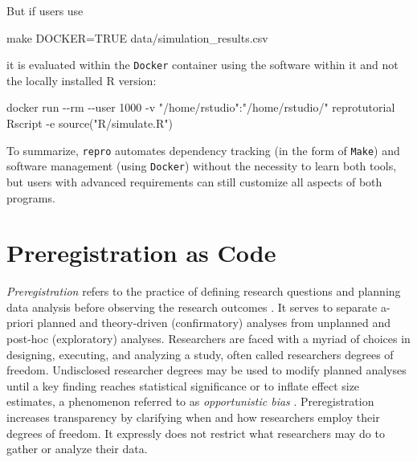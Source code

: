 \documentclass[psych,tutorial,submit,moreauthors,pdftex]{mdpi}
\newenvironment{Shaded}{\begin{snugshade}}{\end{snugshade}}
\newcommand{\AttributeTok}[1]{\textcolor[rgb]{0.77,0.63,0.00}{#1}}
\newcommand{\ExtensionTok}[1]{#1}
\newcommand{\FunctionTok}[1]{\textcolor[rgb]{0.00,0.00,0.00}{#1}}
\newcommand{\NormalTok}[1]{#1}
\newcommand{\StringTok}[1]{\textcolor[rgb]{0.31,0.60,0.02}{#1}}
\begin{document}
But if users use

\begin{Shaded}
\begin{Highlighting}[]
\FunctionTok{make}\NormalTok{ DOCKER=TRUE data/simulation\_results.csv}
\end{Highlighting}
\end{Shaded}

it is evaluated within the \texttt{Docker} container using the software
within it and not the locally installed R version:

\begin{Shaded}
\begin{Highlighting}[]
\ExtensionTok{docker}\NormalTok{ run }\AttributeTok{{-}{-}rm} \AttributeTok{{-}{-}user}\NormalTok{ 1000 }\AttributeTok{{-}v} \StringTok{"/home/rstudio"}\NormalTok{:}\StringTok{"/home/rstudio/"}
\ExtensionTok{reprotutorial}\NormalTok{ Rscript }\AttributeTok{{-}e} \StringTok{\textquotesingle{}source("R/simulate.R")\textquotesingle{}}
\end{Highlighting}
\end{Shaded}

To summarize, \texttt{repro} automates dependency tracking (in the form
of \texttt{Make}) and software management (using \texttt{Docker})
without the necessity to learn both tools, but users with advanced
requirements can still customize all aspects of both programs.

\hypertarget{preregistration-as-code}{%
\section{Preregistration as Code}\label{preregistration-as-code}}

\emph{Preregistration} refers to the practice of defining research
questions and planning data analysis before observing the research
outcomes \citep{NosekRevolution2018}. It serves to separate a-priori
planned and theory-driven (confirmatory) analyses from unplanned and
post-hoc (exploratory) analyses. Researchers are faced with a myriad of
choices in designing, executing, and analyzing a study, often called
researchers degrees of freedom. Undisclosed researcher degrees may be
used to modify planned analyses until a key finding reaches statistical
significance or to inflate effect size estimates, a phenomenon referred
to as \emph{opportunistic bias}
\citep{decosterOpportunisticBiasesTheir2015}. Preregistration increases
transparency by clarifying when and how researchers employ their degrees
of freedom. It expressly does not restrict what researchers may do to
gather or analyze their data.
\end{document}
